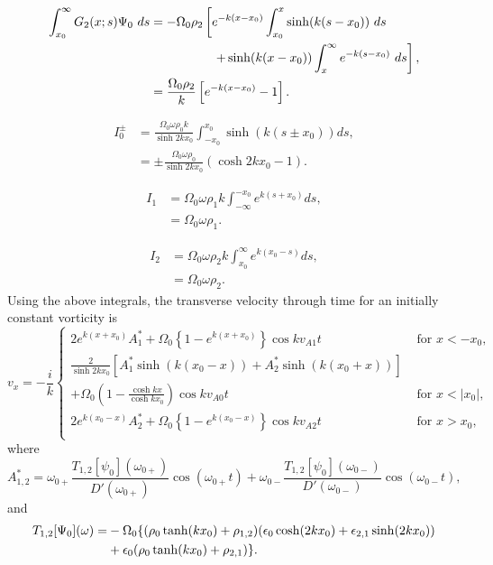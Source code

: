 \documentclass[12pt, draft]{../style-files/ociamthesis}
\begin{document}
\begin{align}
\int_{x_0}^{\infty} G_2(x;s) \Psi_0 ~ds &= - \Omega_0 \rho_2 \left[ e^{-k(x-x_0)} \int_{x_0}^{x} \sinh(k(s-x_0)) ~ds \right. \notag \\
&\qquad \qquad \quad \left. + \sinh(k(x-x_0)) \int_{x}^{\infty} e^{-k(s-x_0)} ~ds \right], \notag \\
&= \frac{\Omega_0 \rho_2}{k} \left[ e^{-k(x-x_0)} - 1 \right].
\end{align}

\begin{align}
I_0^\pm &= \frac{\Omega_0\omega\rho_0k}{\sinh{2kx_0}} \int_{-x_0}^{x_0} \sinh(k(s \pm x_0)) ds, \\
&= \pm \frac{\Omega_0 \omega \rho_0}{\sinh{2kx_0}} (\cosh{2kx_0 - 1}).
\end{align}

\begin{align}
I_1 &= \Omega_0\omega\rho_1k \int_{-\infty}^{-x_0} e^{k(s + x_0)} ds, \\
&= \Omega_0 \omega \rho_1.
\end{align}

\begin{align}
I_2 &= \Omega_0\omega\rho_2k \int_{x_0}^{\infty} e^{k(x_0 - s)} ds, \\
&= \Omega_0 \omega \rho_2.
\end{align}
Using the above integrals, the transverse velocity through time for an initially constant vorticity is
\begin{equation}
v_x = -\frac{i}{k}\begin{cases}
2 e^{k(x+x_0)} A^*_1 + \Omega_0 \left\{1 - e^{k(x+x_0)}\right\} \cos{kv_{A1}t} \quad &\text{ for } x<-x_0, \\
\frac{2}{\sinh{2kx_0}} \left[ A^*_1 \sinh(k(x_0 - x)) + A^*_2 \sinh(k(x_0 + x)) \right] & \\
+ \Omega_0 \left( 1 - \frac{\cosh{kx}}{\cosh{kx_0}} \right)\cos{kv_{A0}t} \quad &\text{ for } x < |x_0|, \\
2 e^{k(x_0-x)} A^*_2 + \Omega_0 \left\{1 - e^{k(x_0-x)}\right\} \cos{kv_{A2}t} \quad &\text{ for } x>x_0, \\
\end{cases}
\label{sol slab}
\end{equation}
where
\begin{equation}
A^*_{1,2} = \omega_{0+} \frac{T_{1,2}[\psi_0](\omega_{0+})}{D'(\omega_{0+})} \cos(\omega_{0+} t) + \omega_{0-}\frac{T_{1,2}[\psi_0](\omega_{0-})}{D'(\omega_{0-})} \cos(\omega_{0-} t),
\end{equation}
and
\begin{align}
T_{1,2}[\Psi_0](\omega) = &-\Omega_0\{ (\rho_0 \tanh(kx_0) + \rho_{1,2}) (\epsilon_0 \cosh(2kx_0) + \epsilon_{2,1}\sinh(2kx_0)) \notag \\
&+ \epsilon_0(\rho_0 \tanh(kx_0) + \rho_{2,1}) \}.
\end{align}
\end{document}
